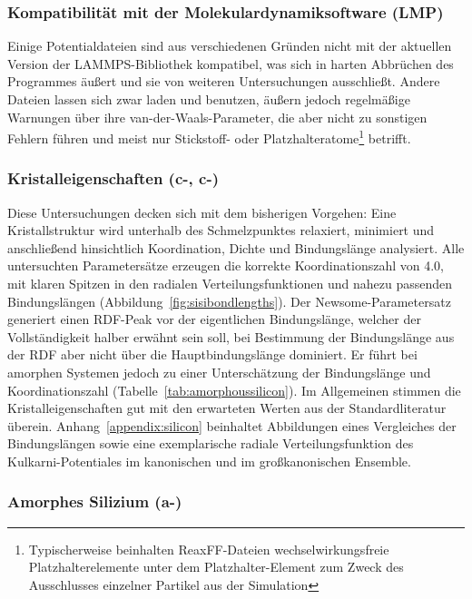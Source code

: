 \subsubsection{Kompatibilität mit der Molekulardynamiksoftware (LMP)}

Einige Potentialdateien sind aus verschiedenen Gründen nicht mit der aktuellen Version der LAMMPS-Bibliothek kompatibel, was sich in harten Abbrüchen des Programmes äußert und sie von weiteren Untersuchungen ausschließt.
Andere Dateien lassen sich zwar laden und benutzen, äußern jedoch regelmäßige Warnungen über ihre van-der-Waals-Parameter, die aber nicht zu sonstigen Fehlern führen und meist nur Stickstoff- oder Platzhalteratome\footnote{Typischerweise beinhalten ReaxFF-Dateien wechselwirkungsfreie Platzhalterelemente unter dem Platzhalter-Element  zum Zweck des Ausschlusses einzelner Partikel aus der Simulation} betrifft.

\subsubsection{Kristalleigenschaften (c-, c-)}

Diese Untersuchungen decken sich mit dem bisherigen Vorgehen:
Eine Kristallstruktur wird unterhalb des Schmelzpunktes relaxiert, minimiert und anschließend hinsichtlich Koordination, Dichte und Bindungslänge analysiert.
Alle untersuchten Parametersätze erzeugen die korrekte Koordinationszahl von 4.0, mit klaren Spitzen in den radialen Verteilungsfunktionen und nahezu passenden Bindungslängen (Abbildung~\ref{fig:sisibondlengths}).
Der Newsome-Parametersatz generiert einen RDF-Peak vor der eigentlichen Bindungslänge, welcher der Vollständigkeit halber erwähnt sein soll, bei Bestimmung der Bindungslänge aus der RDF aber nicht über die Hauptbindungslänge dominiert.
Er führt bei amorphen Systemen jedoch zu einer Unterschätzung der Bindungslänge und Koordinationszahl (Tabelle~\ref{tab:amorphoussilicon}).
Im Allgemeinen stimmen die Kristalleigenschaften gut mit den erwarteten Werten aus der Standardliteratur überein.
Anhang~\ref{appendix:silicon} beinhaltet Abbildungen eines Vergleiches der Bindungslängen sowie eine exemplarische radiale Verteilungsfunktion des Kulkarni-Potentiales im kanonischen und im großkanonischen Ensemble.

\subsubsection{Amorphes Silizium (a-)}

